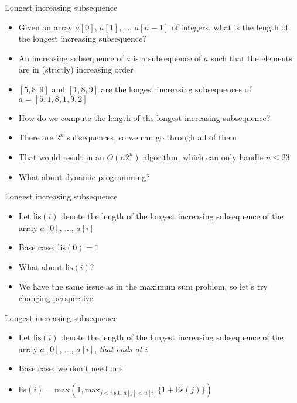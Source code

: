 \documentclass[10pt]{beamer}
\newcommand{\bi}{\begin{itemize}}
\newcommand{\ei}{\end{itemize}}
\begin{document}
\begin{frame}{Longest increasing subsequence}
    \bi
\item Given an array $a[0]$, $a[1]$, \ldots, $a[n-1]$ of integers, what is the length of the longest increasing subsequence?
    \vspace{5pt}
\item An increasing subsequence of $a$ is a subsequence of $a$ such that the elements are in (strictly) increasing order
    \vspace{5pt}
\item $[5,8,9]$ and $[1,8,9]$ are the longest increasing subsequences of $a = [5,1,8,1,9,2]$

    \vspace{5pt}
\item How do we compute the length of the longest increasing subsequence?
\item There are $2^n$ subsequences, so we can go through all of them
\item That would result in an $O(n2^n)$ algorithm, which can only handle $n\leq 23$
    \vspace{5pt}
\item What about dynamic programming?

    \ei
\end{frame}

\begin{frame}{Longest increasing subsequence}
    \vspace{20pt}
    \bi
\item Let $\mathrm{lis}(i)$ denote the length of the longest increasing subsequence of the array $a[0]$, $\ldots$, $a[i]$
    \vspace{5pt}
\item Base case: $\mathrm{lis}(0) = 1$
\item What about $\mathrm{lis}(i)$?
    \vspace{10pt}
\item We have the same issue as in the maximum sum problem, so let's try changing perspective
    \ei
\end{frame}

\begin{frame}{Longest increasing subsequence}
    \vspace{40pt}
    \bi
\item Let $\mathrm{lis}(i)$ denote the length of the longest increasing subsequence of the array $a[0]$, $\ldots$, $a[i]$, \textit{that ends at $i$}
    \vspace{5pt}
\item Base case: we don't need one
\item $\mathrm{lis}(i) = \mathrm{max}(1, \mathrm{max}_{j<i \textrm{ s.t. } a[j] < a[i]} \{ 1 + \mathrm{lis}(j) \})$
    \ei
\end{frame}
\end{document}
